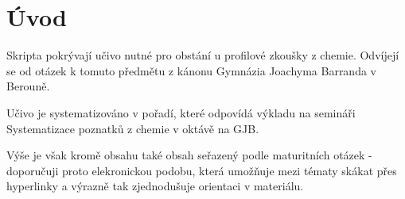 \section{Úvod}
    Skripta pokrývají učivo nutné pro obstání u profilové zkoušky z chemie. Odvíjejí se od otázek k tomuto předmětu z kánonu Gymnázia Joachyma Barranda v Berouně.

    Učivo je systematizováno v pořadí, které odpovídá výkladu na semináři Systematizace poznatků z chemie v oktávě na GJB. 

    Výše je však kromě obsahu také obsah seřazený podle maturitních otázek - doporučuji proto elekronickou podobu, která umožňuje mezi tématy skákat přes hyperlinky a výrazně tak zjednodušuje orientaci v materiálu.
